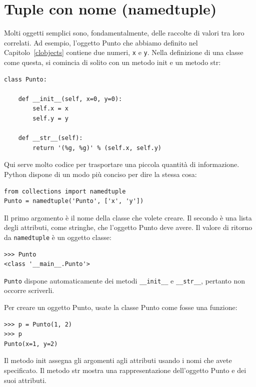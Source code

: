 \documentclass[10pt]{book}
\begin{document}
\section{Tuple con nome (namedtuple)}

Molti oggetti semplici sono, fondamentalmente, delle raccolte di valori tra loro correlati. Ad esempio, l'oggetto Punto che abbiamo definito nel Capitolo~\ref{clobjects} contiene due numeri, {\tt x} e {\tt y}.  Nella definizione di una classe come questa, si comincia di solito con un metodo init e un metodo str:

\begin{verbatim}
class Punto:

    def __init__(self, x=0, y=0):
        self.x = x
        self.y = y

    def __str__(self):
        return '(%g, %g)' % (self.x, self.y)
\end{verbatim}

Qui serve molto codice per trasportare una piccola quantità di informazione. Python dispone di un modo più conciso per dire la stessa cosa:

\begin{verbatim}
from collections import namedtuple
Punto = namedtuple('Punto', ['x', 'y'])
\end{verbatim}

Il primo argomento è il nome della classe che volete creare. Il secondo è una lista degli attributi, come stringhe, che l'oggetto Punto deve avere. Il valore di ritorno da {\tt namedtuple} è un oggetto classe:

\begin{verbatim}
>>> Punto
<class '__main__.Punto'>
\end{verbatim}

{\tt Punto} dispone automaticamente dei metodi \verb"__init__" e
\verb"__str__", pertanto non occorre scriverli.

Per creare un oggetto Punto, usate la classe Punto come fosse una funzione:

\begin{verbatim}
>>> p = Punto(1, 2)
>>> p
Punto(x=1, y=2)
\end{verbatim}

Il metodo init assegna gli argomenti agli attributi usando i nomi che avete specificato. Il metodo str mostra una rappresentazione dell'oggetto Punto e dei suoi attributi. 
\end{document}
